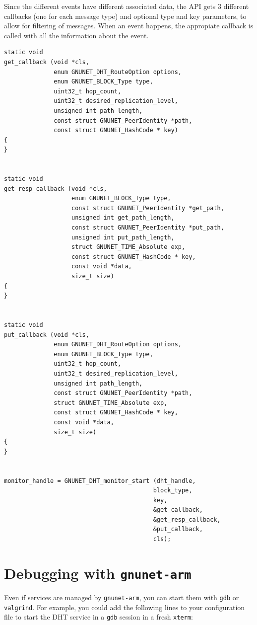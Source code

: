 \documentclass[10pt]{article}
\begin{document}
Since the different events have different associated data, the API gets 3
different callbacks (one for each message type) and optional type and key parameters,
to allow for filtering of messages. When an event happens, the appropiate callback
is called with all the information about the event.
\lstset{language=C}
\begin{lstlisting}
static void
get_callback (void *cls,
              enum GNUNET_DHT_RouteOption options,
              enum GNUNET_BLOCK_Type type,
              uint32_t hop_count,
              uint32_t desired_replication_level,
              unsigned int path_length,
              const struct GNUNET_PeerIdentity *path,
              const struct GNUNET_HashCode * key)
{
}


static void
get_resp_callback (void *cls,
                   enum GNUNET_BLOCK_Type type,
                   const struct GNUNET_PeerIdentity *get_path,
                   unsigned int get_path_length,
                   const struct GNUNET_PeerIdentity *put_path,
                   unsigned int put_path_length,
                   struct GNUNET_TIME_Absolute exp,
                   const struct GNUNET_HashCode * key,
                   const void *data,
                   size_t size)
{
}


static void
put_callback (void *cls,
              enum GNUNET_DHT_RouteOption options,
              enum GNUNET_BLOCK_Type type,
              uint32_t hop_count,
              uint32_t desired_replication_level,
              unsigned int path_length,
              const struct GNUNET_PeerIdentity *path,
              struct GNUNET_TIME_Absolute exp,
              const struct GNUNET_HashCode * key,
              const void *data,
              size_t size)
{
}


monitor_handle = GNUNET_DHT_monitor_start (dht_handle,
                                          block_type,
                                          key,
                                          &get_callback,
                                          &get_resp_callback,
                                          &put_callback,
                                          cls);
\end{lstlisting}


\section{Debugging with {\tt gnunet-arm}}

Even if services are managed by {\tt gnunet-arm}, you can start them with
{\tt gdb} or {\tt valgrind}.  For example, you could add the following lines
to your configuration file to start the DHT service in a {\tt gdb} session in a
fresh {\tt xterm}:
\end{document}
